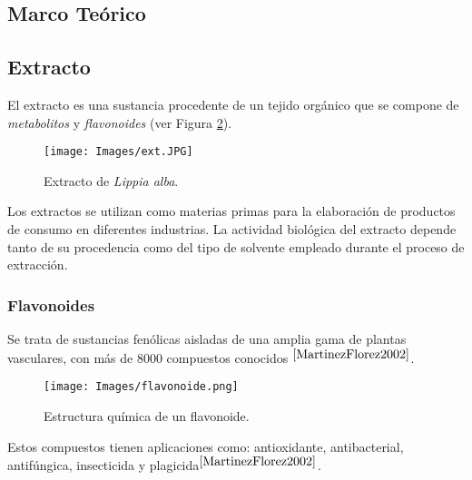 \begin{center}
	\section{Marco Te\'orico}
\end{center}

\subsection{Extracto}

\noindent
\justify

El extracto es una sustancia procedente de un tejido org\'anico que se compone de \textit{metabolitos} y 
\textit{flavonoides} (ver Figura \ref{flav}). 

\begin{figure}[h!]
\centering
\texttt{[image: Images/ext.JPG]}
\caption{Extracto de \textit{Lippia alba}.}
\label{extalba}
\end{figure}

\noindent
\justify

Los extractos se utilizan como materias primas para la elaboraci\'on de productos de consumo en diferentes industrias. La actividad biol\'ogica del extracto depende tanto de su procedencia como del tipo de solvente empleado durante el proceso de extracci\'on.

\subsubsection{Flavonoides}

\noindent
\justify

Se trata de sustancias fen\'olicas aisladas de una amplia gama de plantas vasculares, con m\'as de 8000 compuestos conocidos $^{\cite{MartinezFlorez2002}}$.

\begin{figure}[h!]
\centering
\texttt{[image: Images/flavonoide.png]}
\caption{Estructura qu\'imica de un flavonoide.}
\label{flav}
\end{figure}

\noindent
\justify

Estos compuestos tienen aplicaciones como: antioxidante, antibacterial, antif\'ungica, insecticida y plagicida$^{\cite{MartinezFlorez2002}}$.





\newpage








